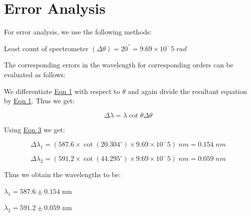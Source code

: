 \section{Error Analysis}

	For error analysis, we use the following methods:

	Least count of spectrometer $(\Delta \theta) = 20^{''} = 9.69 \times 10^-5 \; rad$

	\vspace{3mm}
	The corresponding errors in the wavelength for corresponding orders can be evaluated as follows:

	\vspace{3mm}
	We differentiate \hyperref[eqn:1]{Eqn 1} with respect to $\theta$ and again divide the resultant equation by \hyperref[eqn:1]{Eqn 1}. Thus we get:

	\begin{equation}
		\Delta\lambda = \lambda\cot\theta\Delta\theta
	\end{equation}\label{eqn:3}

	\vspace{-5mm}
	Using \hyperref[eqn:3]{Eqn 3} we get:

	$$\Delta\lambda_1 = (587.6 \times \cot(20.304^\circ) \times 9.69 \times 10^-5) \; nm = 0.154 \; nm$$

	\vspace{-5mm}
	$$\Delta\lambda_2 = (591.2 \times \cot(44.295^\circ) \times 9.69 \times 10^-5) \; nm = 0.059\; nm$$

	Thus we obtain the wavelengths to be:
	\begin{center}
		$\lambda_{1} = 587.6 \pm 0.154$ nm

		$\lambda_{2} = 591.2 \pm 0.059$ nm
	\end{center}
